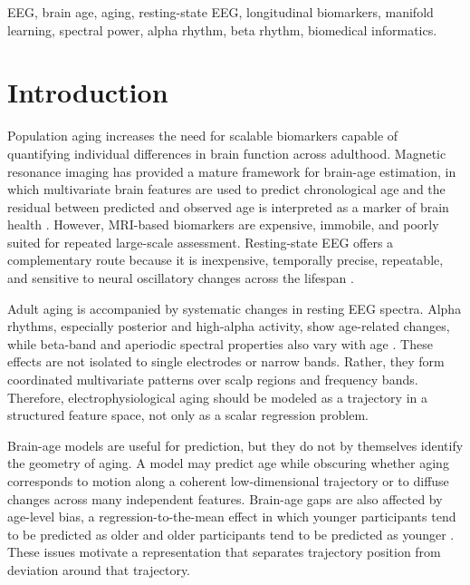 \documentclass[journal]{IEEEtran}
\begin{document}
\begin{IEEEkeywords}
EEG, brain age, aging, resting-state EEG, longitudinal biomarkers, manifold learning, spectral power, alpha rhythm, beta rhythm, biomedical informatics.
\end{IEEEkeywords}

\section{Introduction}

Population aging increases the need for scalable biomarkers capable of quantifying individual differences in brain function across adulthood. Magnetic resonance imaging has provided a mature framework for brain-age estimation, in which multivariate brain features are used to predict chronological age and the residual between predicted and observed age is interpreted as a marker of brain health \cite{franke2010estimating,cole2017predicting,bashyam2020mri,cole2020multimodality}. However, MRI-based biomarkers are expensive, immobile, and poorly suited for repeated large-scale assessment. Resting-state EEG offers a complementary route because it is inexpensive, temporally precise, repeatable, and sensitive to neural oscillatory changes across the lifespan \cite{dustman1993eeg,klimesch1999eeg,voytek2015age,donoghue2020parameterizing}.

Adult aging is accompanied by systematic changes in resting EEG spectra. Alpha rhythms, especially posterior and high-alpha activity, show age-related changes, while beta-band and aperiodic spectral properties also vary with age \cite{dustman1993eeg,haegens2014alpha,mierau2017state,voytek2015age,donoghue2020parameterizing}. These effects are not isolated to single electrodes or narrow bands. Rather, they form coordinated multivariate patterns over scalp regions and frequency bands. Therefore, electrophysiological aging should be modeled as a trajectory in a structured feature space, not only as a scalar regression problem.

Brain-age models are useful for prediction, but they do not by themselves identify the geometry of aging. A model may predict age while obscuring whether aging corresponds to motion along a coherent low-dimensional trajectory or to diffuse changes across many independent features. Brain-age gaps are also affected by age-level bias, a regression-to-the-mean effect in which younger participants tend to be predicted as older and older participants tend to be predicted as younger \cite{le2018nonlinear,smith2020brain,liang2023age}. These issues motivate a representation that separates trajectory position from deviation around that trajectory.
\end{document}
